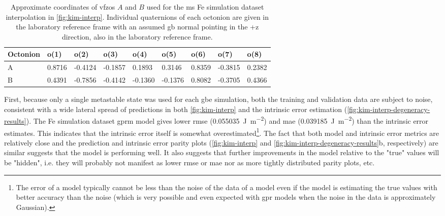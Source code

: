 \documentclass[final,twocolumn,12pt]{elsarticle}
\begin{document}
\begin{table}
\centering
\caption{Approximate coordinates of \glspl{vfzo} $A$ and $B$ used for the \gls{ms} Fe simulation dataset interpolation in \cref{fig:kim-interp}. Individual quaternions of each octonion are given in the laboratory reference frame with an assumed \gls{gb} normal pointing in the +z direction, also in the laboratory reference frame.}
\label{tab:tunnel-AB2}
\begin{tabular}{lllllllll}
\hline
Octonion & o(1)   & o(2)    & o(3)    & o(4)    & o(5)    & o(6)   & o(7)    & o(8)   \\ \hline
A        & 0.8716 & -0.4124 & -0.1857 & 0.1893  & 0.3146  & 0.8359 & -0.3815 & 0.2382 \\
B        & 0.4391 & -0.7856 & -0.4142 & -0.1360 & -0.1376 & 0.8082 & -0.3705 & 0.4366 \\ \hline
\end{tabular}
\end{table}

First, because only a single metastable state was used for each \gls{gbe} simulation, both the training and validation data are subject to noise, consistent with a wide lateral spread of predictions in both \cref{fig:kim-interp} and the intrinsic error estimation (\cref{fig:kim-interp-degeneracy-results}). The Fe simulation dataset \gls{gprm} model gives lower \gls{rmse} (\SI{0.055035}{\joule\per\square\meter}) and \gls{mae} (\SI{0.039185}{\joule\per\square\meter}) than the intrinsic error estimates. This indicates that the intrinsic error itself is somewhat overestimated\footnote{The \outpt{} error of a model typically cannot be less than the noise of the \outpt{} data of a model even if the model is estimating the true \outpt{} values with better accuracy than the noise (which is very possible and even expected with \gls{gpr} models when the noise in the \inpt{} data is approximately Gaussian).}. The fact that both model and intrinsic error metrics are relatively close and the prediction and intrinsic error parity plots (\cref{fig:kim-interp} and \cref{fig:kim-interp-degeneracy-results}b, respectively) are similar suggests that the model is performing well. It also suggests that further improvements in the model relative to the "true" values will be "hidden", i.e. they will probably not manifest as lower \gls{rmse} or \gls{mae} nor as more tightly distributed parity plots, etc.

\end{document}
